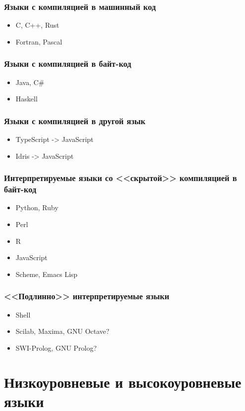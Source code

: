 \documentclass[9pt,pdf]{beamer}
\begin{document}
\begin{frame}
	\frametitle{Языки с компиляцией в машинный код}
	\begin{itemize}
		\item C, C++, Rust
		\item Fortran, Pascal
	\end{itemize}
\end{frame}

\begin{frame}
	\frametitle{Языки с компиляцией в байт-код}
	\begin{itemize}
		\item Java, C\#
		\item Haskell
	\end{itemize}
\end{frame}

\begin{frame}
	\frametitle{Языки с компиляцией в другой язык}
	\begin{itemize}
		\item TypeScript -> JavaScript
		\item Idris -> JavaScript
	\end{itemize}
\end{frame}

\begin{frame}
	\frametitle{Интерпретируемые языки со <<скрытой>> компиляцией в байт-код}
	\begin{itemize}
		\item Python, Ruby
		\item Perl
		\item R
		\item JavaScript
		\item Scheme, Emacs Lisp
	\end{itemize}
\end{frame}

\begin{frame}
	\frametitle{<<Подлинно>> интерпретируемые языки}
	\begin{itemize}
		\item Shell
		\item Scilab, Maxima, GNU Octave?
		\item SWI-Prolog, GNU Prolog?
	\end{itemize}
\end{frame}

\section{Низкоуровневые и высокоуровневые языки}
\end{document}
